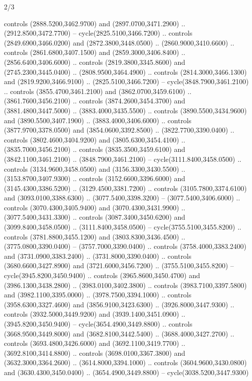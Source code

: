 \begin{flagdescription}{2/3}
\begin{scope}[shift={(0.5\flaglength,0.5)},scale=\flagwidth/130]
\begin{scope}[y=0.01mm, x=0.01mm,shift={(-3365,-2250)}]
  controls (2888.5200,3462.9700) and (2897.0700,3471.2900) ..
  (2912.8500,3472.7700) -- cycle(2825.5100,3466.7200) .. controls
  (2849.6900,3466.0200) and (2872.3800,3448.0500) .. (2860.9000,3410.6600) ..
  controls (2861.6800,3407.1500) and (2859.3000,3406.8400) ..
  (2856.6400,3406.6000) .. controls (2819.3800,3345.8600) and
  (2745.2300,3445.0400) .. (2808.9500,3464.4900) .. controls
  (2814.3000,3466.1300) and (2819.9200,3466.9100) .. (2825.5100,3466.7200) --
  cycle(3848.7900,3461.2100) .. controls (3855.4700,3461.2100) and
  (3862.0700,3459.6100) .. (3861.7600,3456.2100) .. controls
  (3874.2600,3454.3700) and (3881.4800,3447.5000) .. (3883.4000,3435.5500) ..
  controls (3890.5500,3434.9600) and (3890.5500,3407.1900) ..
  (3883.4000,3406.6000) .. controls (3877.9700,3378.0500) and
  (3854.0600,3392.8500) .. (3822.7700,3390.0400) .. controls
  (3802.4600,3404.9200) and (3805.6300,3454.4100) .. (3835.7000,3456.2100) ..
  controls (3835.3500,3459.6100) and (3842.1100,3461.2100) ..
  (3848.7900,3461.2100) -- cycle(3111.8400,3458.0500) .. controls
  (3134.9600,3458.0500) and (3156.3300,3430.5500) .. (3153.8700,3407.9300) ..
  controls (3152.6600,3396.6000) and (3145.4300,3386.5200) ..
  (3129.4500,3381.7200) .. controls (3105.7800,3374.6100) and
  (3093.0100,3388.6300) .. (3077.5400,3398.3200) -- (3077.5400,3406.6000) ..
  controls (3070.4300,3405.9400) and (3070.4300,3431.9900) ..
  (3077.5400,3431.3300) .. controls (3087.3400,3450.6200) and
  (3099.8400,3458.0500) .. (3111.8400,3458.0500) -- cycle(3755.5100,3455.8200)
  .. controls (3781.8800,3455.1200) and (3803.8300,3436.4500) ..
  (3775.0800,3390.0400) -- (3757.7000,3390.0400) .. controls
  (3758.4000,3383.2400) and (3731.0900,3383.2400) .. (3731.8000,3390.0400) ..
  controls (3680.6600,3427.8900) and (3721.6000,3456.7200) ..
  (3755.5100,3455.8200) -- cycle(3945.8200,3450.9400) .. controls
  (3965.8600,3450.4700) and (3986.1300,3438.2800) .. (3983.0100,3402.3800) ..
  controls (3983.7100,3397.5800) and (3982.1100,3395.0000) ..
  (3978.7500,3394.1000) .. controls (3958.6300,3327.4600) and
  (3856.9100,3423.6300) .. (3926.8000,3447.9300) .. controls
  (3932.5000,3449.9200) and (3939.1400,3451.0900) .. (3945.8200,3450.9400) --
  cycle(3654.4900,3449.8800) .. controls (3668.9500,3449.8000) and
  (3682.8100,3442.5400) .. (3688.4000,3427.2700) .. controls
  (3693.4800,3426.6000) and (3692.1100,3419.7700) .. (3692.8100,3414.8800) ..
  controls (3698.0100,3367.3800) and (3632.3000,3364.2600) ..
  (3614.8000,3394.1000) .. controls (3604.9600,3430.0800) and
  (3630.4300,3450.0400) .. (3654.4900,3449.8800) -- cycle(3038.5200,3447.9300)

\end{scope}
\end{scope}
\end{flagdescription}
